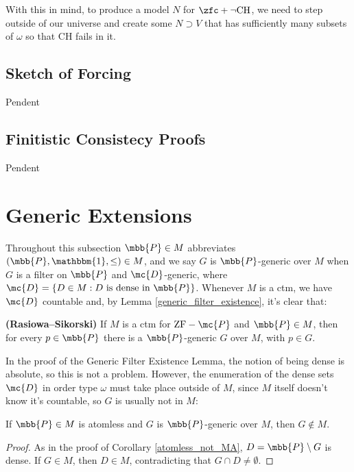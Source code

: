 With this in mind, to produce a model $N$ for $\zfc+\neg\text{CH}$, we need to step outside of our universe and create some $N\supset V$ that has sufficiently many subsets of $\omega$ so that CH fails in it.

\subsection{Sketch of Forcing}

\textcolor{laser_eyes}{Pendent}

\subsection{Finitistic Consistecy Proofs}

\textcolor{laser_eyes}{Pendent}

\section{Generic Extensions}

Throughout this subsection $\mbb{P}\in M$ abbreviates $(\mbb{P},\mathbbm{1},\leq)\in M$, and we say $G$ is $\mbb{P}$-generic over $M$ when $G$ is a filter on $\mbb{P}$ and $\mc{D}$-generic, where $\mc{D}=\{D\in M:D\text{ is dense in }\mbb{P}\}$. Whenever $M$ is a ctm, we have $\mc{D}$ countable and, by Lemma \ref{generic_filter_existence}, it's clear that:

\begin{lemma}{}{}
    \textbf{(Rasiowa–Sikorski)} If $M$ is a ctm for $\text{ZF}-\mc{P}$ and $\mbb{P}\in M$, then for every $p\in\mbb{P}$ there is a $\mbb{P}$-generic $G$ over $M$, with $p\in G$.
\end{lemma}

In the proof of the Generic Filter Existence Lemma, the notion of being dense is absolute, so this is not a problem. However, the enumeration of the dense sets $\mc{D}$ in order type $\omega$ must take place outside of $M$, since $M$ itself doesn't know it's countable, so $G$ is usually not in $M$:

\begin{lemma}{}{}
    If $\mbb{P}\in M$ is atomless and $G$ is $\mbb{P}$-generic over $M$, then $G\notin M$.
\end{lemma}

\begin{proof}
    As in the proof of Corollary \ref{atomless_not_MA}, $D=\mbb{P}\setminus G$ is dense. If $G\in M$, then $D\in M$, contradicting that $G\cap D\neq\emptyset$.
\end{proof}

